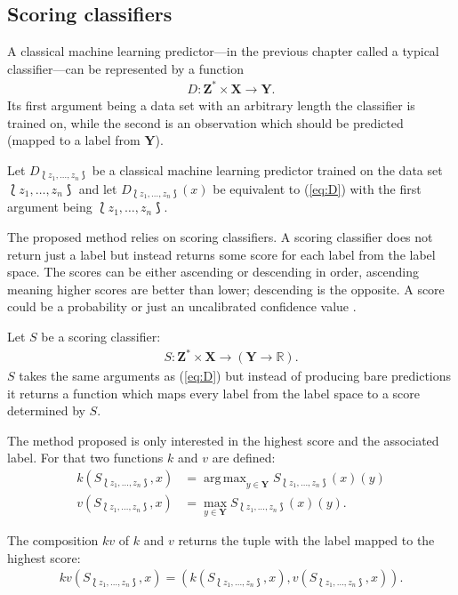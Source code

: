 \documentclass[twoside,11pt]{article}
\DeclareMathOperator*{\argmax}{arg\,max}
\def\ds{\Lbag z_1,\dots,z_n \Rbag}
\begin{document}
\subsection{Scoring classifiers}

A classical machine learning predictor---in the previous
chapter called a typical classifier---can be represented
by a function
\begin{align}
  \label{eq:D}
  D: \textbf{Z}^* \times \textbf{X} \rightarrow \textbf{Y}.
\end{align}
Its first argument being a data set with an arbitrary
length the classifier is trained on, while the second is an
observation which should be predicted
(mapped to a label from $\textbf{Y}$).

Let $D_{\ds}$ be a classical machine
learning predictor trained on the data set $\ds$ and
let $D_{\ds}(x)$ be equivalent to (\ref{eq:D}) with the
first argument being $\ds$.

The proposed method relies on scoring classifiers.
A scoring classifier does not return just
a label but instead returns some score for each label from
the label space.
The scores can be either ascending or descending in order,
ascending meaning higher scores are better than lower;
descending is the opposite.
A score could be a probability or just an uncalibrated
confidence value \citep[see][]{vanderlooy_et_al_2009}.

Let $S$ be a scoring classifier:
\begin{align}
  \label{eq:S}
  S: \textbf{Z}^* \times \textbf{X} \rightarrow
     (\textbf{Y} \rightarrow \mathbb{R}).
\end{align}
$S$ takes the same arguments as (\ref{eq:D}) but instead
of producing bare predictions it returns a function which
maps every label from the label space to a score
determined by $S$.

The method proposed is only interested in the highest
score and the associated label. For that two functions
$k$ and $v$ are defined:
\begin{align*}
  k(S_{\ds}, x) &= \argmax_{y \in \textbf{Y}}
    S_{\ds}(x)(y) \\
  v(S_{\ds}, x) &= \max_{y \in \textbf{Y}}
    S_{\ds}(x)(y).
\end{align*}

The composition $kv$ of $k$ and $v$ returns the tuple with
the label mapped to the highest score:
\begin{align}
  \label{eq:kv}
  kv(S_{\ds}, x) = (k(S_{\ds}, x), v(S_{\ds}, x)).
\end{align}
\end{document}
